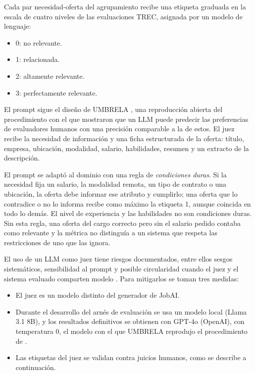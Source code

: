 Cada par necesidad-oferta del agrupamiento recibe una etiqueta graduada en la escala de cuatro niveles de las evaluaciones TREC, asignada por un modelo de lenguaje:
\begin{itemize}
    \item 0: no relevante.
    \item 1: relacionada.
    \item 2: altamente relevante.
    \item 3: perfectamente relevante.
\end{itemize}
El prompt sigue el diseño de UMBRELA \citep{Upadhyay2024}, una reproducción abierta del procedimiento con el que \citet{Thomas2024} mostraron que un LLM puede predecir las preferencias de evaluadores humanos con una precisión comparable a la de estos. El juez recibe la necesidad de información y una ficha estructurada de la oferta: título, empresa, ubicación, modalidad, salario, habilidades, resumen y un extracto de la descripción.

El prompt se adaptó al dominio con una regla de \emph{condiciones duras}. Si la necesidad fija un salario, la modalidad remota, un tipo de contrato o una ubicación, la oferta debe informar ese atributo y cumplirlo; una oferta que lo contradice o no lo informa recibe como máximo la etiqueta 1, aunque coincida en todo lo demás. El nivel de experiencia y las habilidades no son condiciones duras. Sin esta regla, una oferta del cargo correcto pero sin el salario pedido contaba como relevante y la métrica no distinguía a un sistema que respeta las restricciones de uno que las ignora.

El uso de un LLM como juez tiene riesgos documentados, entre ellos sesgos sistemáticos, sensibilidad al prompt y posible circularidad cuando el juez y el sistema evaluado comparten modelo \citep{Faggioli2023,Zheng2023}. Para mitigarlos se toman tres medidas:
\begin{itemize}
    \item El juez es un modelo distinto del generador de JobAI.
    \item Durante el desarrollo del arnés de evaluación se usa un modelo local (Llama 3.1 8B), y los resultados definitivos se obtienen con GPT-4o (OpenAI), con temperatura 0, el modelo con el que UMBRELA reprodujo el procedimiento de \citet{Thomas2024}.
    \item Las etiquetas del juez se validan contra juicios humanos, como se describe a continuación.
\end{itemize}

